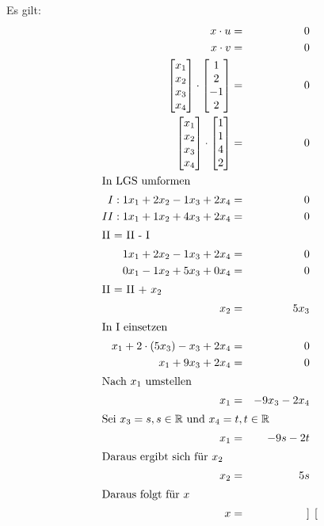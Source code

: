 \documentclass[10pt,a4paper,oneside,ngerman,numbers=noenddot]{scrartcl}
\begin{document}
\subsection{} %
Es gilt: \\
\begin{alignat*}{2}
x \cdot u &=& 0 \\
x \cdot v &=& 0 \\
\begin{bmatrix}
x_{1} \\
x_{2} \\
x_{3} \\
x_{4}
\end{bmatrix} \cdot 
\begin{bmatrix}
1 \\
2 \\
-1 \\
2
\end{bmatrix} &=& 0 \\
\begin{bmatrix}
x_{1} \\
x_{2} \\
x_{3} \\
x_{4}
\end{bmatrix} \cdot 
\begin{bmatrix}
1 \\
1 \\
4 \\
2
\end{bmatrix} &=& 0 \\
\intertext{In LGS umformen}
I: 1x_{1} + 2x_{2} - 1x_{3} + 2x_{4} &=& 0 \\
II: 1x_{1} + 1x_{2} + 4x_{3} + 2x_{4} &=& 0 \\
\intertext{II = II - I}
1x_{1} + 2x_{2} - 1x_{3} + 2x_{4} &=& 0 \\
0x_{1} - 1x_{2} + 5x_{3} + 0x_{4} &=& 0 \\
\intertext{II = II + $x_{2}$}
x_{2} &=& 5x_{3} \\
\intertext{In I einsetzen}
x_{1} + 2 \cdot (5x_{3}) - x_{3} + 2x_{4} &=& 0 \\
x_{1} + 9x_{3} + 2x_{4} &=& 0 \\
\intertext{Nach $x_{1}$ umstellen}
x_{1} &=& -9x_{3} - 2x_{4} \\
\intertext{Sei $x_{3} = s, s \in \mathbb{R}$ und $x_{4} = t, t \in \mathbb{R}$}
x_{1} &=& -9s - 2t \\
\intertext{Daraus ergibt sich für $x_{2}$}
x_{2} &=& 5s \\
\intertext{Daraus folgt für $x$}
x &=& \begin{bmatrix}

\end{bmatrix}
\end{alignat*}
\end{document}
